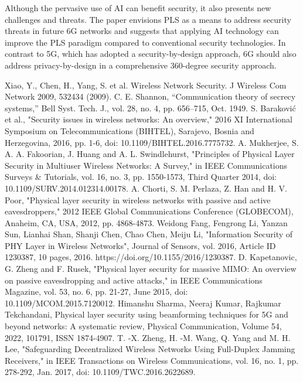\documentclass[conference]{IEEEtran}
\begin{document}
Although the pervasive use of AI can benefit security, it also presents new challenges and threats. The paper envisions PLS as a means to address security threats in future 6G networks and suggests that applying AI technology can improve the PLS paradigm compared to conventional security technologies. In contrast to 5G, which has adopted a security-by-design approach, 6G should also address privacy-by-design in a comprehensive 360-degree security approach.


\begin{thebibliography}{00}

Xiao, Y., Chen, H., Yang, S. et al. Wireless Network Security. J Wireless Com Network 2009, 532434 (2009). 
 C. E. Shannon, “Communication theory of secrecy systems,” Bell Syst. Tech. J., vol. 28, no. 4, pp. 656–715, Oct. 1949.
 S. Baraković et al., "Security issues in wireless networks: An overview," 2016 XI International Symposium on Telecommunications (BIHTEL), Sarajevo, Bosnia and Herzegovina, 2016, pp. 1-6, doi: 10.1109/BIHTEL.2016.7775732.
 A. Mukherjee, S. A. A. Fakoorian, J. Huang and A. L. Swindlehurst, "Principles of Physical Layer Security in Multiuser Wireless Networks: A Survey," in IEEE Communications Surveys & Tutorials, vol. 16, no. 3, pp. 1550-1573, Third Quarter 2014, doi: 10.1109/SURV.2014.012314.00178.
 A. Chorti, S. M. Perlaza, Z. Han and H. V. Poor, "Physical layer security in wireless networks with passive and active eavesdroppers," 2012 IEEE Global Communications Conference (GLOBECOM), Anaheim, CA, USA, 2012, pp. 4868-4873.
 Weidong Fang, Fengrong Li, Yanzan Sun, Lianhai Shan, Shanji Chen, Chao Chen, Meiju Li, "Information Security of PHY Layer in Wireless Networks", Journal of Sensors, vol. 2016, Article ID 1230387, 10 pages, 2016. https://doi.org/10.1155/2016/1230387. 
 D. Kapetanovic, G. Zheng and F. Rusek, "Physical layer security for massive MIMO: An overview on passive eavesdropping and active attacks," in IEEE Communications Magazine, vol. 53, no. 6, pp. 21-27, June 2015, doi: 10.1109/MCOM.2015.7120012.
Himanshu Sharma, Neeraj Kumar, Rajkumar Tekchandani, Physical layer security using beamforming techniques for 5G and beyond networks: A systematic review, Physical Communication, Volume 54, 2022, 101791, ISSN 1874-4907.
 T. -X. Zheng, H. -M. Wang, Q. Yang and M. H. Lee, "Safeguarding Decentralized Wireless Networks Using Full-Duplex Jamming Receivers," in IEEE Transactions on Wireless Communications, vol. 16, no. 1, pp. 278-292, Jan. 2017, doi: 10.1109/TWC.2016.2622689.

\end{thebibliography}
\end{document}
